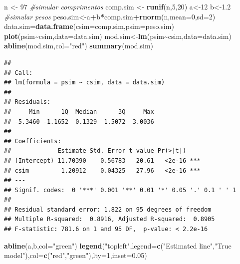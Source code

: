 \documentclass[
]{book}
\newenvironment{Shaded}{\begin{snugshade}}{\end{snugshade}}
\newcommand{\AttributeTok}[1]{\textcolor[rgb]{0.13,0.29,0.53}{#1}}
\newcommand{\CommentTok}[1]{\textcolor[rgb]{0.56,0.35,0.01}{\textit{#1}}}
\newcommand{\DecValTok}[1]{\textcolor[rgb]{0.00,0.00,0.81}{#1}}
\newcommand{\FloatTok}[1]{\textcolor[rgb]{0.00,0.00,0.81}{#1}}
\newcommand{\FunctionTok}[1]{\textcolor[rgb]{0.13,0.29,0.53}{\textbf{#1}}}
\newcommand{\NormalTok}[1]{#1}
\newcommand{\OtherTok}[1]{\textcolor[rgb]{0.56,0.35,0.01}{#1}}
\newcommand{\SpecialCharTok}[1]{\textcolor[rgb]{0.81,0.36,0.00}{\textbf{#1}}}
\newcommand{\StringTok}[1]{\textcolor[rgb]{0.31,0.60,0.02}{#1}}
\begin{document}
\begin{Shaded}
\begin{Highlighting}[]
\NormalTok{n }\OtherTok{\textless{}{-}} \DecValTok{97}
\CommentTok{\#simular comprimentos}
\NormalTok{comp.sim }\OtherTok{\textless{}{-}} \FunctionTok{runif}\NormalTok{(n,}\DecValTok{5}\NormalTok{,}\DecValTok{20}\NormalTok{)}
\NormalTok{a}\OtherTok{\textless{}{-}}\DecValTok{12}
\NormalTok{b}\OtherTok{\textless{}{-}}\FloatTok{1.2}
\CommentTok{\#simular pesos}
\NormalTok{peso.sim}\OtherTok{\textless{}{-}}\NormalTok{a}\SpecialCharTok{+}\NormalTok{b}\SpecialCharTok{*}\NormalTok{comp.sim}\SpecialCharTok{+}\FunctionTok{rnorm}\NormalTok{(n,}\AttributeTok{mean=}\DecValTok{0}\NormalTok{,}\AttributeTok{sd=}\DecValTok{2}\NormalTok{)}
\NormalTok{data.sim}\OtherTok{=}\FunctionTok{data.frame}\NormalTok{(}\AttributeTok{csim=}\NormalTok{comp.sim,}\AttributeTok{psim=}\NormalTok{peso.sim)}
\FunctionTok{plot}\NormalTok{(psim}\SpecialCharTok{\textasciitilde{}}\NormalTok{csim,}\AttributeTok{data=}\NormalTok{data.sim)}
\NormalTok{mod.sim}\OtherTok{\textless{}{-}}\FunctionTok{lm}\NormalTok{(psim}\SpecialCharTok{\textasciitilde{}}\NormalTok{csim,}\AttributeTok{data=}\NormalTok{data.sim)}
\FunctionTok{abline}\NormalTok{(mod.sim,}\AttributeTok{col=}\StringTok{"red"}\NormalTok{)}
\FunctionTok{summary}\NormalTok{(mod.sim)}
\end{Highlighting}
\end{Shaded}

\begin{verbatim}
## 
## Call:
## lm(formula = psim ~ csim, data = data.sim)
## 
## Residuals:
##     Min      1Q  Median      3Q     Max 
## -5.3460 -1.1652  0.1329  1.5072  3.0036 
## 
## Coefficients:
##             Estimate Std. Error t value Pr(>|t|)    
## (Intercept) 11.70390    0.56783   20.61   <2e-16 ***
## csim         1.20912    0.04325   27.96   <2e-16 ***
## ---
## Signif. codes:  0 '***' 0.001 '**' 0.01 '*' 0.05 '.' 0.1 ' ' 1
## 
## Residual standard error: 1.822 on 95 degrees of freedom
## Multiple R-squared:  0.8916, Adjusted R-squared:  0.8905 
## F-statistic: 781.6 on 1 and 95 DF,  p-value: < 2.2e-16
\end{verbatim}

\begin{Shaded}
\begin{Highlighting}[]
\FunctionTok{abline}\NormalTok{(a,b,}\AttributeTok{col=}\StringTok{"green"}\NormalTok{)}
\FunctionTok{legend}\NormalTok{(}\StringTok{"topleft"}\NormalTok{,}\AttributeTok{legend=}\FunctionTok{c}\NormalTok{(}\StringTok{"Estimated line"}\NormalTok{,}\StringTok{"True model"}\NormalTok{),}\AttributeTok{col=}\FunctionTok{c}\NormalTok{(}\StringTok{"red"}\NormalTok{,}\StringTok{"green"}\NormalTok{),}\AttributeTok{lty=}\DecValTok{1}\NormalTok{,}\AttributeTok{inset=}\FloatTok{0.05}\NormalTok{)}
\end{Highlighting}
\end{Shaded}
\end{document}
